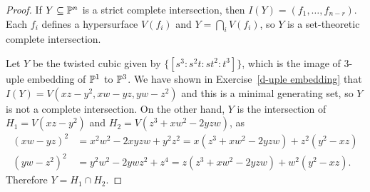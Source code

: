 \documentclass[11pt]{book}
\theoremstyle{definition}
\begin{document}
\begin{proof}
If $Y\sub\P^n$ is a strict complete intersection, then $I(Y)=(f_1,\dots,f_{n-r})$. Each $f_i$ defines a hypersurface $V(f_i)$ and $Y=\bigcap_iV(f_i)$, so $Y$ is a set-theoretic complete intersection.\par
Let $Y$ be the twisted cubic given by $\{[s^3:s^2t:st^2:t^3]\}$, which is the image of $3$-uple embedding of $\P^1$ to $\P^3$. We have shown in Exercise~\ref{d-uple embedding} that $I(Y)=V(xz-y^2,xw-yz,yw-z^2)$ and this is a minimal generating set, so $Y$ is not a complete intersection. On the other hand, $Y$ is the intersection of $H_1=V(xz-y^2)$ and $H_2=V(z^3+xw^2-2yzw)$, as
\begin{align*}
(xw-yz)^2&=x^2w^2-2xyzw+y^2z^2=x(z^3+xw^2-2yzw)+z^2(y^2-xz)\\
(yw-z^2)^2&=y^2w^2-2ywz^2+z^4=z(z^3+xw^2-2yzw)+w^2(y^2-xz).
\end{align*}
Therefore $Y=H_1\cap H_2$.
\end{proof}
\end{document}
